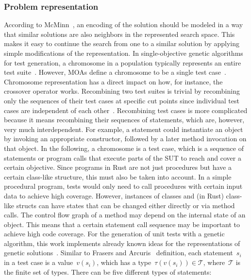 \documentclass{article}
\begin{document}
\subsubsection{Problem representation}
\label{sec:problem-representation}
According to McMinn~\cite{McMinn_2004}, an encoding of the solution should be modeled in a way that similar solutions are also neighbors in the represented search space. This makes it easy to continue the search from one to a similar solution by applying simple modifications of the representation. In single-objective genetic algorithms for test generation, a chromosome in a population typically represents an entire test suite~\cite{Fraser_2011, Campos2017}. However, \acp{MOA} define a chromosome to be a single test case~\cite{Panichella2018}. Chromosome representation has a direct impact on how, for instance, the crossover operator works. Recombining two test suites is trivial by recombining only the sequences of their test cases at specific cut points since individual test cases are independent of each other~\cite{Fraser_2013}. Recombining test cases is more complicated because it means recombining their sequences of statements, which are, however, very much interdependent. For example, a statement could instantiate an object by invoking an appropriate constructor, followed by a later method invocation on that object. In the following, a chromosome is a test case, which is a sequence of statements or program calls that execute parts of the \ac{SUT} to reach and cover a certain objective. Since programs in Rust are not just procedures but have a certain class-like structure, this must also be taken into account. In a simple procedural program, tests would only need to call procedures with certain input data to achieve high coverage. However, instances of classes and (in Rust) class-like structs can have states that can be changed either directly or via method calls. The control flow graph of a method may depend on the internal state of an object. This means that a certain statement call sequence may be important to achieve high code coverage. For the generation of unit tests with a genetic algorithm, this work implements already known ideas for the representations of genetic solutions~\cite{Fraser2012,Tonella2004,Arcuri2008}. Similar to Frasers and Arcuris~\cite{Fraser_2011} definition, each statement~$s_i$ in a test case is a value~$v(s_i)$, which has a type~$\tau(v(s_i)) \in \mathcal{T}$, where~$\mathcal{T}$ is the finite set of types. There can be five different types of statements:
\end{document}
